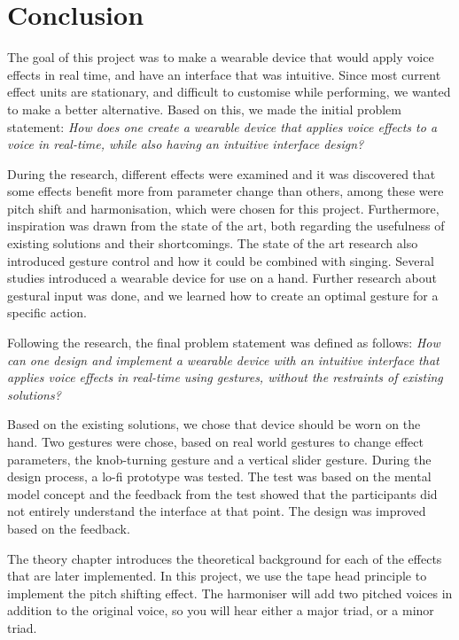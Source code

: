 \chapter{Conclusion}

The goal of this project was to make a wearable device that would apply voice effects in real time, and have an interface that was intuitive. Since most current effect units are stationary, and difficult to customise while performing, we wanted to make a better alternative. Based on this, we made the initial problem statement:
\textit{How does one create a wearable device that applies voice effects to a voice in real-time, while also having an intuitive interface design?}

During the research, different effects were examined and it was discovered that some effects benefit more from parameter change than others, among these were pitch shift and harmonisation, which were chosen for this project. Furthermore, inspiration was drawn from the state of the art, both regarding the usefulness of existing solutions and their shortcomings. The state of the art research also introduced gesture control and how it could be combined with singing. Several studies introduced a wearable device for use on a hand. Further research about gestural input was done, and we learned how to create an optimal gesture for a specific action.

Following the research, the final problem statement was defined as follows: 
\textit{How can one design and implement a wearable device with an intuitive interface that applies voice effects in real-time using gestures, without the restraints of existing solutions?}

Based on the existing solutions, we chose that device should be worn on the hand. Two gestures were chose, based on real world gestures  to change effect parameters, the knob-turning gesture and a vertical slider gesture. During the design process, a lo-fi prototype was tested. The test was based on the mental model concept and the feedback from the test showed that the participants did not entirely understand the interface at that point. The design was improved based on the feedback.

The theory chapter introduces the theoretical background for each of the effects that are later implemented. In this project, we use the tape head principle to implement the pitch shifting effect. The harmoniser will add two pitched voices in addition to the original voice, so you will hear either a major triad, or a minor triad.

